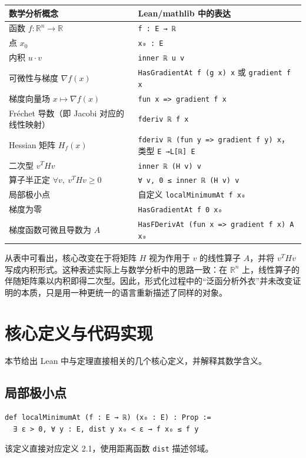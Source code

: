 ﻿\documentclass[UTF8,a4paper,zihao=-4]{ctexart}
\begin{document}
\begin{center}
\begin{tabularx}{\textwidth}{@{}p{}X@{}}
\toprule
数学分析概念 & Lean/mathlib 中的表达 \\
\midrule
函数 \(f:\mathbb{R}^n\to\mathbb{R}\) & \texttt{f : E → ℝ} \\
点 \(x_0\) & \texttt{x₀ : E} \\
内积 \(u\cdot v\) & \texttt{inner ℝ u v} \\
可微性与梯度 \(\nabla f(x)\) & \texttt{HasGradientAt f (g x) x} 或 \texttt{gradient f x} \\
梯度向量场 \(x\mapsto \nabla f(x)\) & \texttt{fun x => gradient f x} \\
Fréchet 导数（即 Jacobi 对应的线性映射） & \texttt{fderiv ℝ f x} \\
Hessian 矩阵 \(H_f(x)\) & \texttt{fderiv ℝ (fun y => gradient f y) x}，类型 \texttt{E →L[ℝ] E} \\
二次型 \(v^T H v\) & \texttt{inner ℝ (H v) v} \\
算子半正定 \(\forall v,\ v^T H v\ge0\) & \texttt{∀ v, 0 ≤ inner ℝ (H v) v} \\
局部极小点 & 自定义 \texttt{localMinimumAt f x₀} \\
梯度为零 & \texttt{HasGradientAt f 0 x₀} \\
梯度函数可微且导数为 \(A\) & \texttt{HasFDerivAt (fun x => gradient f x) A x₀} \\
\bottomrule
\end{tabularx}
\end{center}

从表中可看出，核心改变在于将矩阵 \(H\) 视为作用于 \(v\) 的线性算子 \(A\)，并将 \(v^T H v\) 写成内积形式。这种表述实际上与数学分析中的思路一致：在 \(\mathbb{R}^n\) 上，线性算子的伴随矩阵乘以内积即得二次型。因此，形式化过程中的“泛函分析外衣”并未改变证明的本质，只是用一种更统一的语言重新描述了同样的对象。

\section{核心定义与代码实现}
本节给出 Lean 中与定理直接相关的几个核心定义，并解释其数学含义。

\subsection{局部极小点}
\begin{verbatim}
def localMinimumAt (f : E → ℝ) (x₀ : E) : Prop :=
  ∃ ε > 0, ∀ y : E, dist y x₀ < ε → f x₀ ≤ f y
\end{verbatim}
该定义直接对应定义 2.1，使用距离函数 \texttt{dist} 描述邻域。
\end{document}
